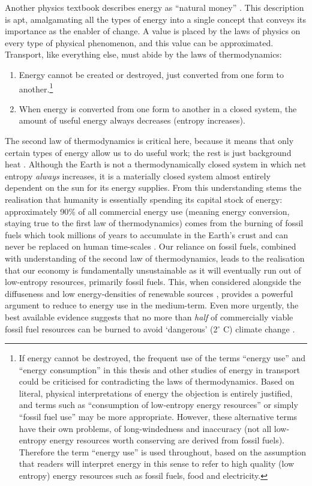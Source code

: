 \documentclass[a4paper, 11pt, twoside]{Thesis}
\begin{document}
Another physics textbook describes energy as ``natural money''
\citep[p.~269]{Knight2007}. This description is apt, amalgamating all the
types of energy into a single concept that conveys its importance as the
enabler of change. A value is placed by the laws of physics on
every type of physical phenomenon, and this value can be approximated.
Transport, like everything else, must abide by the laws of
thermodynamics:
\begin{enumerate}
 \item Energy cannot be created or destroyed, just converted from one form to
another.\footnote{If energy cannot be destroyed, the frequent use of the
terms ``energy use'' and ``energy consumption'' in this
thesis and other studies of energy in transport could be criticised for
contradicting the laws of thermodynamics. Based on literal, physical
interpretations of energy the objection is entirely justified, and terms such
as ``consumption of low-entropy energy resources'' or simply ``fossil fuel
use'' may be more appropriate. However, these alternative terms have their
own problems, of long-windedness and inaccuracy (not all low-entropy energy
resources worth conserving are derived from fossil fuels). Therefore the term
``energy use'' is used throughout, based on the assumption that readers will
interpret energy in this sense to refer to high quality (low entropy) energy
resources such as fossil fuels, food and electricity.}
\item When energy is converted from one form to another in a closed
system, the amount of useful energy always decreases (entropy increases).
\end{enumerate}
The second law of thermodynamics is critical here, because it means that only
certain types of energy allow us to do useful work; the rest is just background
heat \citep{Soddy1912}. Although the Earth is not a thermodynamically closed
system in which net entropy \emph{always} increases, it is a materially closed
system almost entirely dependent on the sun for its energy supplies. From this
understanding stems the realisation that humanity is essentially spending its
capital stock of energy: approximately 90\% of all commercial energy use
(meaning energy conversion, staying true to the first law of thermodynamics)
comes from the burning of fossil fuels which took millions of years to
accumulate in the Earth's crust and can never be replaced on human time-scales
\citep{Smil2008}. Our reliance on fossil fuels, combined with understanding of
the second law of thermodynamics, leads to the realisation that our economy is
fundamentally unsustainable as it will eventually run out of low-entropy
resources, primarily fossil fuels. This, when considered alongside the
diffuseness and low energy-densities of renewable sources \citep{MacKay2009},
provides a powerful argument to reduce to energy use in the medium-term.
Even more urgently, the best available evidence suggests that
no more than \emph{half} of commercially viable fossil fuel resources can be
burned to avoid `dangerous' (2$^\circ$ C) climate change
\citep{Berners-Lee2013}. 
\end{document}
